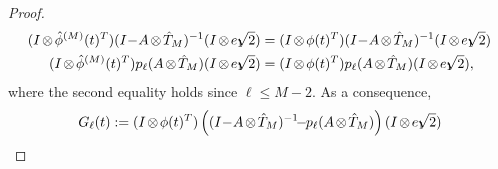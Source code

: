\documentclass[final,1p,times,number]{elsarticle}
\theoremstyle{plain}%
\begin{document}
\begin{proof}
\begin{align*} %
    (I\hspace{-1pt}\otimes \hspace{-1pt}\hat\phi^{(M)}(t)^T) (I\hspace{-2pt}-\hspace{-2pt}A\hspace{-1pt}\otimes\hspace{-1pt}\hat{T}_{M})^{-1}(I\hspace{-1pt}\otimes\hspace{-1pt} e_1\hspace{-5pt} \sqrt{2}) 
    &= (I\hspace{-1pt}\otimes \hspace{-1pt}\phi(t)^T) (I\hspace{-2pt}-\hspace{-2pt}A\hspace{-1pt}\otimes\hspace{-1pt}\hat{T}_{M})^{-1}  (I\hspace{-1pt}\otimes\hspace{-1pt} e_1\hspace{-5pt} \sqrt{2}) \\ %
    (I\hspace{-1pt}\otimes \hspace{-1pt}\hat\phi^{(M)}(t)^T)p_\ell(A\hspace{-1pt}\otimes\hspace{-1pt}\hat{T}_{M}) (I\hspace{-1pt}\otimes\hspace{-1pt} e_1\hspace{-5pt} \sqrt{2}) 
    &= (I\hspace{-1pt}\otimes \hspace{-1pt}\phi(t)^T) p_\ell(A\hspace{-1pt}\otimes\hspace{-1pt}\hat{T}_{M})(I\hspace{-1pt}\otimes\hspace{-1pt} e_1\hspace{-5pt} \sqrt{2}),
\end{align*}
where the second equality holds since $\ell \leq M-2$. As a consequence, 
\begin{align*}
G_\ell(t) &:= (I\hspace{-1pt}\otimes \hspace{-1pt}\phi(t)^T)\left( (I\hspace{-2pt}-\hspace{-2pt}A\hspace{-1pt}\otimes\hspace{-1pt}\hat{T}_{M})^{-1}\hspace{-4pt}-\hspace{-3pt}p_\ell(A\hspace{-1pt}\otimes\hspace{-1pt}\hat{T}_{M}) \right) (I\hspace{-1pt}\otimes\hspace{-1pt} e_1\hspace{-5pt} \sqrt{2}) \\ 

\end{align*}
\end{proof}
\end{document}
